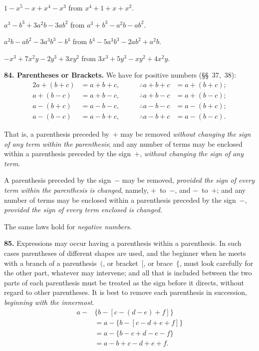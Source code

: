 \documentclass[12pt]{book}[2005/09/16]
\newcommand{\Paragraph}[1]{\medskip\par\textbf{#1}}
\newcommand{\Item}[1]{\vspace{4pt plus 16pt}\makebox[1em][r]{\textbf{#1}\ }}
\begin{document}
\Item{13.}  $1 - x^{5} - x + x^{4} - x^{3}$ from $x^{4} + 1 + x + x^{2}$.

\Item{14.}  $a^{3} - b^{3} + 3a^{2}b - 3ab^{2}$ from $a^{3} + b^{3} - a^{2}b - ab^{2}$.

\Item{15.}  $a^{2} b - ab^{2} - 3a^{3} b^{3} - b^{4}$ from $b^{4} - 5a^{3} b^{3} - 2ab^{2} + a^{2} b$.

\Item{16.}  $-x^{3} + 7x^{2} y - 2y^{3} + 3xy^{2}$ from $3x^{3} + 5y^{3} - xy^{2} + 4x^{2}y$.

\Paragraph{84.  Parentheses or Brackets.} We have for positive numbers
(§§~37,~38):
\begin{alignat*}{2}
a + (b + c) &= a + b + c,\qquad & \therefore  a + b + c &= a + (b + c); \\
a + (b - c) &= a + b - c,       & \therefore  a + b - c &= a + (b - c); \\
a - (b + c) &= a - b - c,       & \therefore  a - b - c &= a - (b + c); \\
a - (b - c) &= a - b + c,       & \therefore  a - b + c &= a - (b - c).
\end{alignat*}

That is, a parenthesis preceded by~$+$ may be removed
\emph{without changing the sign of any term within the parenthesis};
and any number of terms may be enclosed within a parenthesis
preceded by the sign~$+$, \emph{without changing the sign
of any term}.

A parenthesis preceded by the sign~$-$ may be removed,
\emph{provided the sign of every term within the parenthesis is
changed}, namely, $+$~to~$-$, and $-$~to~$+$; and any number
of terms may be enclosed within a parenthesis preceded
by the sign~$-$, \emph{provided the sign of every term enclosed is
changed}.

The same laws hold for \emph{negative numbers}.

\Paragraph{85.}  Expressions may occur having a parenthesis within
a parenthesis.  In such cases parentheses of different shapes
are used, and the beginner when he meets with a branch
of a parenthesis~$($, or bracket~$[$, or brace~$\{$, must look carefully
for the other part, whatever may intervene; and all
that is included between the two parts of each parenthesis
must be treated as the sign before it directs, without regard
to other parentheses.  It is best to remove each parenthesis
in succession, \emph{beginning with the innermost}.
\begin{align*}
a - &\bigl\{b - [c - (d - e) + f]\bigr\} \\
  &= a - \bigl\{b - [c - d + e + f]\bigr\} \\
  &= a - \bigl\{b - c + d - e - f\bigr\} \\
  &= a - b + c - d + e + f.
\end{align*}
\end{document}
